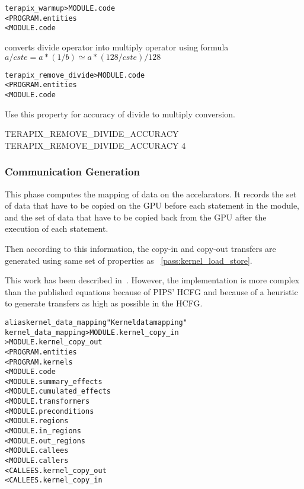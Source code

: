 \documentclass[a4paper]{report}
\newenvironment{PipsMake}{\begin{alltt}}{\end{alltt}}
\newcommand{\PipsPassRef}[1]{\texttt{\detokenize{#1}}~\ref{pass:#1}}
\newenvironment{PipsPass}[1]{\label{pass:#1}}{}
\begin{document}
\begin{PipsMake}
terapix_warmup > MODULE.code
        < PROGRAM.entities
        < MODULE.code
\end{PipsMake}

\begin{PipsPass}{terapix_remove_divide}
 converts divide operator into multiply operator using formula
  $a/cste = a* (1/b) \simeq a * ( 128 / cste ) / 128$
\end{PipsPass}
\begin{PipsMake}
terapix_remove_divide > MODULE.code
        < PROGRAM.entities
        < MODULE.code
\end{PipsMake}
Use this property for accuracy of divide to multiply conversion.
\begin{PipsProp}{TERAPIX_REMOVE_DIVIDE_ACCURACY}
TERAPIX_REMOVE_DIVIDE_ACCURACY 4
\end{PipsProp}

\subsubsection{Communication Generation}


\begin{PipsPass}{kernel_data_mapping}
This phase computes the mapping of data on the accelarators. It records the set
of data that have to be copied on the GPU before each statement in the module,
and the set of data that have to be copied back from the GPU after the execution
of each statement.

Then according to this information, the copy-in and copy-out transfers are
generated using same set of properties as \PipsPassRef{kernel_load_store}.

This work has been described in~\cite{AIK11}\cite{ACIK11}. However, the implementation
is more complex than the published equations because of PIPS' HCFG and because
of a heuristic to generate transfers as high as possible in the HCFG.



\end{PipsPass}
\begin{PipsMake}
alias kernel_data_mapping "Kernel data mapping"
kernel_data_mapping > MODULE.kernel_copy_in
		    > MODULE.kernel_copy_out
        < PROGRAM.entities
        < PROGRAM.kernels
        < MODULE.code
        < MODULE.summary_effects
        < MODULE.cumulated_effects
        < MODULE.transformers
        < MODULE.preconditions
        < MODULE.regions
        < MODULE.in_regions
        < MODULE.out_regions
        < MODULE.callees
        < MODULE.callers
        < CALLEES.kernel_copy_out
        < CALLEES.kernel_copy_in
\end{PipsMake}
\end{document}

